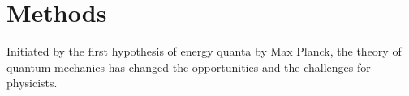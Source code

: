 \chapter{Methods}




Initiated by the first hypothesis of energy quanta by Max Planck, the theory of quantum mechanics has changed the opportunities and the challenges for physicists. 
